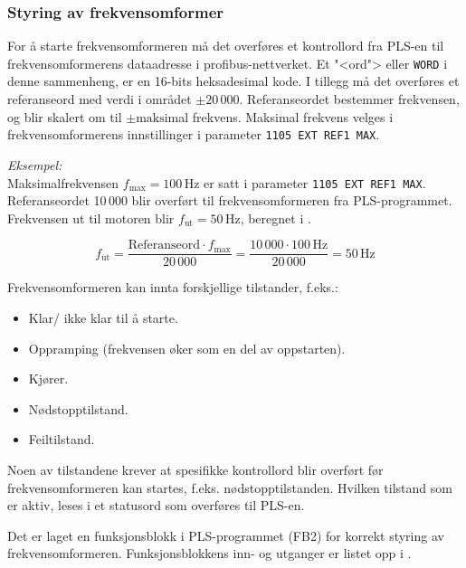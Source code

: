 \documentclass[Visionprosjekt.tex]{subfiles}
\begin{document}
\subsubsection{Styring av frekvensomformer}

For å  starte frekvensomformeren må det overføres et kontrollord fra PLS-en til frekvensomformerens dataadresse i profibus-nettverket. Et "<ord"> eller  \texttt{WORD}  i denne sammenheng, er en 16-bits heksadesimal kode. I tillegg må det overføres et referanseord med verdi i området $\pm 20\,000$. Referanseordet  bestemmer frekvensen, og blir skalert om til $\pm\text{maks}$\-imal frekvens. Maksimal frekvens velges i frekvensomformerens innstillinger i parameter \texttt{1105 EXT REF1 MAX}.

\textit{Eksempel:}\\
\hangindent=6mm
Maksimalfrekvensen $f_\text{max}= 100$\,Hz er satt i parameter \texttt{1105 EXT REF1 MAX}.
Referanseordet 10\,000 blir overført til frekvensomformeren fra PLS-programmet.  Frekvensen ut til motoren blir $f_\text{ut}=50$\,Hz, beregnet i . \cite{profibusadapter}

\begin{equation}
    f_\text{ut}=
    \frac{\text{Referanseord} \cdot f_\text{max}}{20\,000}=
    \frac{10\,000  \cdot  100\,\text{Hz}}{20\,000} = 50\,\text{Hz}
    \label{equ:frekv}
\end{equation}




Frekvensomformeren kan innta forskjellige tilstander, f.eks.:
\begin{itemize}
     \item Klar/ ikke klar til å starte.
     \item Oppramping (frekvensen øker som en del av oppstarten).
     \item Kjører.
     \item Nødstopptilstand.
     \item Feiltilstand.
\end{itemize}
 Noen av  tilstandene krever at spesifikke kontrollord blir overført før frekvensomformeren kan startes, f.eks. nødstopptilstanden. Hvilken tilstand som er aktiv, leses i et statusord som overføres  til PLS-en. \cite{profibusadapter}

Det er laget en funksjonsblokk i PLS-programmet (FB2) for korrekt styring av frekvensomformeren. Funksjonsblokkens inn- og utganger er listet  opp i .
\end{document}
